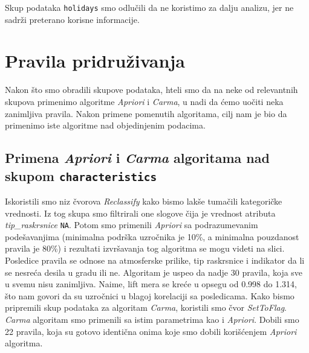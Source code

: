 \documentclass[a4paper,10pt]{article}
\begin{document}
Skup podataka \texttt{holidays} smo odlučili da ne koristimo za dalju analizu, jer ne sadrži preterano korisne informacije.

\section{Pravila pridruživanja}
Nakon što smo obradili skupove podataka, hteli smo da na neke od relevantnih skupova primenimo algoritme \textit{Apriori} i \textit{Carma},
u nadi da ćemo uočiti neka zanimljiva pravila. Nakon primene pomenutih algoritama, cilj nam je bio da primenimo iste algoritme nad objedinjenim podacima.

\subsection{Primena \textit{Apriori} i \textit{Carma} algoritama nad skupom \texttt{characteristics}}
Iskoristili smo niz čvorova \textit{Reclassify} kako bismo lakše tumačili kategoričke vrednosti. Iz tog skupa smo filtrirali one slogove čija je 
vrednost atributa \textit{tip\_raskrsnice} \texttt{NA}. Potom smo primenili \textit{Apriori} sa podrazumevanim podešavanjima 
(minimalna podrška uzročnika je 10\%, a minimalna pouzdanost pravila je 80\%) i rezultati izvršavanja
tog algoritma se mogu videti na slici. Posledice pravila se odnose na atmosferske prilike, tip raskrsnice i indikator da li se nesreća desila u gradu ili ne.
Algoritam je uspeo da nadje 30 pravila, koja sve u svemu nisu zanimljiva. Naime, lift mera se kreće u opsegu od 0.998 do 1.314, što nam govori da su
uzročnici u blagoj korelaciji sa posledicama. Kako bismo pripremili skup podataka za algoritam \textit{Carma}, koristili smo čvor \textit{SetToFlag}. 
\textit{Carma} algoritam smo primenili sa istim parametrima kao i \textit{Apriori}. Dobili smo 22 pravila, koja su gotovo identična onima koje smo
dobili korišćenjem \textit{Apriori} algoritma. \\
 
\end{document}
